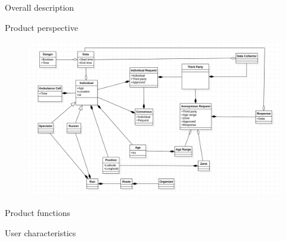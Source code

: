 \documentclass{article}
\begin{document}
\begin{legal}
\newpage
  	\item {Overall description}
  		\begin{legal}
    	\item Product perspective\\
			\begin{figure}[H]
  			\includegraphics[width=\linewidth]{./images/UML1-0.png}
			\end{figure}
		\item Product functions \\
		\item User characteristics \\


\end{legal}
\end{legal}
\end{document}
